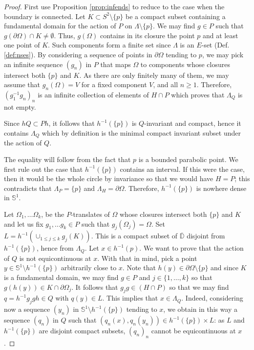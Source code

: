 \documentclass[10pt,a4paper]{amsart}
\begin{document}
\begin{proof}  First use Proposition \ref{prop:infends} to reduce to the case when the boundary is connected. 
Let $K\subset S^2\setminus\{p\}$ be a compact subset containing a fundamental domain for the action
of $P$ on $\Lambda\setminus\{p\}$.  We may find
$g\in P$ such that $g(\partial\Omega)\cap K\ne \emptyset$. 
Thus, $g(\Omega)$ contains in its closure
the point $p$ and at least one point of $K$. Such components form a finite set since $\Lambda$ is an $E$-set (Def. \ref{def:nses}). 
By considering a sequence of points in $\partial\Omega$ tending to $p$, we may pick an infinite sequence $(g_n)$ in $P$ that
maps $\Omega$ to components whose closures intersect both $\{p\}$ and $K$.
As there are only finitely many of them,  we may assume that $g_n(\Omega)=V$ for a fixed component 
$V$,
and all $n\ge 1$. Therefore, $(g_1^{-1}g_n)_n$
is an infinite collection of elements of $H\cap P$ which proves that $\Lambda_Q$ is not empty.

Since $hQ\subset Ph$, it follows that $h^{-1}(\{p\})$ is $Q$-invariant and compact, hence it contains
$\Lambda_Q$ which by definition is the minimal  compact invariant subset under the action of $Q$. 

The equality will follow from the fact that $p$ is a bounded parabolic point. We first rule out the case that $h^{-1}(\{p\})$ contains
an interval. If this were the case, then it would be the whole circle by invariance so that we would have $H=P$; this
contradicts that $\Lambda_P=\{p\}$ and $\Lambda_H=\partial\Omega$. 
Therefore, $h^{-1}(\{p\})$ is nowhere dense in $\mathbb{S}^1$.

Let $\Omega_1,\ldots \Omega_k$, be the $P$-translates
of $\Omega$ whose closures intersect both $\{p\}$ and $K$ and let us fix $g_1,\ldots g_k\in P$ such that
$g_j(\Omega_j)= \Omega$. Set $L= h^{-1}(\cup_{1\le j\le k} g_j(K))$.  This is a compact subset of $\overline{\mathbb{D}}$ disjoint from $h^{-1}(\{p\})$, hence from $\Lambda_Q$.
Let $x\in h^{-1}(p)$.  
We want to prove that the action of $Q$ is not equicontinuous at $x$.
With that in mind,
pick a point $y\in\mathbb{S}^1\setminus h^{-1}(\{p\})$ arbitrarily close to $x$. 
Note that $h(y)\in\partial\Omega\setminus\{p\}$ and since $K$ is a fundamental domain, we may find $g\in P$ and $j\in\{1,\ldots, k\}$ so that $g(h(y))\in K\cap\partial\Omega_j$.
It follows that $g_jg\in (H\cap P)$ so that we may find $q= h^{-1}g_jgh\in Q$ with $q(y)\in L$. This implies that $x\in\Lambda_Q$. 
Indeed, considering now a sequence $(y_n)$ in $\mathbb{S}^1\setminus h^{-1}(\{p\})$ tending to $x$, we obtain in this way a sequence $(q_n)$ in $Q$ such that $(q_n(x), q_n(y_n))\in h^{-1}(\{p\})\times L$: as $L$ and  $h^{-1}(\{p\})$ are disjoint compact subsets, $(q_n)_n$ cannot be equicontinuous at $x$.
\end{proof}
\end{document}
